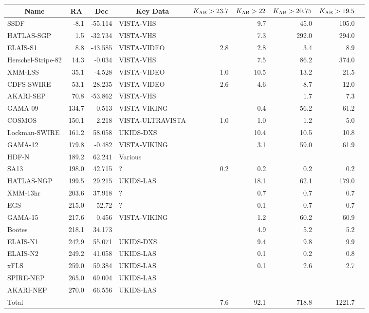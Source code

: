 \begin{tabular}{|l|r|r|l|r|r|r|r|l|}
\hline
  \multicolumn{1}{|c|}{Name} &
  \multicolumn{1}{c|}{RA} &
  \multicolumn{1}{c|}{Dec} &
  \multicolumn{1}{c|}{Key Data} &
  \multicolumn{1}{c|}{$K_{\rm AB}>23.7$} &
  \multicolumn{1}{c|}{$K_{\rm AB}>22$} &
  \multicolumn{1}{c|}{$K_{\rm AB}>20.75$} &
  \multicolumn{1}{c|}{$K_{\rm AB}>19.5$} &
  \\
\hline
  SSDF & -8.1 & -55.114 & VISTA-VHS &  & 9.7 & 45.0 & 105.0 & \\
  HATLAS-SGP & 1.5 & -32.734 & VISTA-VHS &  & 7.3 & 292.0 & 294.0 & \\
  ELAIS-S1 & 8.8 & -43.585 & VISTA-VIDEO & 2.8 & 2.8 & 3.4 & 8.9 & \\
  Herschel-Stripe-82 & 14.3 & -0.034 & VISTA-VHS &  & 7.5 & 86.2 & 374.0 & \\
  XMM-LSS & 35.1 & -4.528 & VISTA-VIDEO & 1.0 & 10.5 & 13.2 & 21.5 & \\
  CDFS-SWIRE & 53.1 & -28.235 & VISTA-VIDEO & 2.6 & 4.6 & 8.7 & 12.0 & \\
  AKARI-SEP & 70.8 & -53.862 & VISTA-VHS &  &  & 1.7 & 7.3 & \\
  GAMA-09 & 134.7 & 0.513 & VISTA-VIKING &  & 0.4 & 56.2 & 61.2 & \\
  COSMOS & 150.1 & 2.218 & VISTA-ULTRAVISTA & 1.0 & 1.0 & 1.2 & 5.0 & \\
  Lockman-SWIRE & 161.2 & 58.058 & UKIDS-DXS &  & 10.4 & 10.5 & 10.8 & \\
  GAMA-12 & 179.8 & -0.482 & VISTA-VIKING &  & 3.1 & 59.0 & 61.9 & \\
  HDF-N & 189.2 & 62.241 & Various &  &  &  &  & \\
  SA13 & 198.0 & 42.715 & ? & 0.2 & 0.2 & 0.2 & 0.2 & \\
  HATLAS-NGP & 199.5 & 29.215 & UKIDS-LAS &  & 18.1 & 62.1 & 179.0 & \\
  XMM-13hr & 203.6 & 37.918 & ? &  & 0.7 & 0.7 & 0.7 & \\
  EGS & 215.0 & 52.72 & ? &  & 0.1 & 0.7 & 0.7 & \\
  GAMA-15 & 217.6 & 0.456 & VISTA-VIKING &  & 1.2 & 60.2 & 60.9 & \\
  Bo\"otes & 218.1 & 34.173 &  &  & 4.9 & 5.2 & 5.2 & \\
  ELAIS-N1 & 242.9 & 55.071 & UKIDS-DXS &  & 9.4 & 9.8 & 9.9 & \\
  ELAIS-N2 & 249.2 & 41.058 & UKIDS-LAS &  & 0.1 & 0.2 & 0.8 & \\
  xFLS & 259.0 & 59.384 & UKIDS-LAS &  & 0.1 & 2.6 & 2.7 & \\
  SPIRE-NEP & 265.0 & 69.004 & UKIDS-LAS &  &  &  &  & \\
  AKARI-NEP & 270.0 & 66.556 & UKIDS-LAS &  &  &  &  & \\
  Total	&	&	&	& 7.6	&92.1	&718.8	&1221.7\\
\hline\end{tabular}
